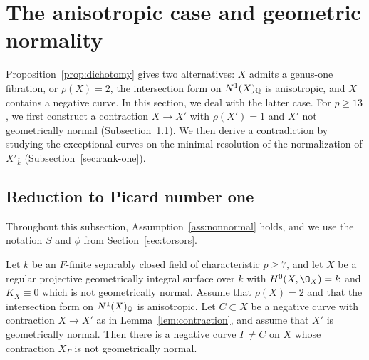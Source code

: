 \section{The anisotropic case and geometric normality}\label{sec:anisotropic}
Proposition~\ref{prop:dichotomy} gives two alternatives: $X$ admits a genus-one fibration, or $\rho(X) = 2$, the intersection form on $N^1(X)_{\mathbb{Q}}$ is anisotropic, and $X$ contains a negative curve.
In this section, we deal with the latter case.
For $p\geq 13$, we first construct a contraction $X\to X'$ with $\rho(X') = 1$ and $X'$ not geometrically normal (Subsection~\ref{sec:rank-two}).
We then derive a contradiction by studying the exceptional curves on the minimal resolution of the normalization of $X'_{\bar k}$ (Subsection~\ref{sec:rank-one}).

\subsection{Reduction to Picard number one}\label{sec:rank-two}

Throughout this subsection, Assumption~\ref{ass:nonnormal} holds, and we use the notation $S$ and $\phi$ from Section~\ref{sec:torsors}.

\begin{lemma}\label{lem:second-curve}
Let $k$ be an $F$-finite separably closed field of characteristic $p\geq 7$, and let $X$ be a regular projective geometrically integral surface over $k$ with $H^0(X,\O_X) = k$ and $K_X\equiv 0$ which is not geometrically normal.
Assume that $\rho(X) = 2$ and that the intersection form on $N^1(X)_{\mathbb{Q}}$ is anisotropic.
Let $C\subset X$ be a negative curve with contraction $X\to X'$ as in Lemma~\textup{\ref{lem:contraction}}, and assume that $X'$ is geometrically normal.
Then there is a negative curve $\Gamma\neq C$ on $X$ whose contraction $X_\Gamma$ is not geometrically normal.
\end{lemma}

